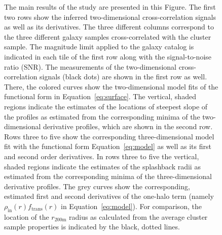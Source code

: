 \documentclass[iop, apjl, twocolappendix, numberedappendix]{emulateapj}
\begin{document}
\begin{figure}
\caption{The main results of the study are presented in this Figure.
The first two rows show the inferred two-dimensional cross-correlation
signals as well as its derivatives.
The three different columns correspond to the three different galaxy
samples cross-correlated with the cluster sample.
The magnitude limit applied to the galaxy catalog is indicated in 
each tile of the first row along with the signal-to-noise ratio (SNR).
The measurements of the two-dimensional cross-correlation
signals (black dots) are shown in the first row as well. There, the colored
curves show the two-dimensional model fits of the functional
form in Equation~\ref{eq:surface}. The vertical, shaded regions indicate 
the estimates of the locations of steepest slope of the profiles as estimated from the corresponding minima of the two-dimensional
derivative profiles, which are shown in the second row. 
Rows three to five show the corresponding three-dimensional model fit
with the functional form Equation~\ref{eq:model} as well as its first and
second order derivatives.
In rows three to five the vertical, shaded regions indicate the 
estimates of the splashback radii as estimated from the corresponding minima 
of the three-dimensional derivative profiles.
The grey curves show the corresponding, estimated first and second derivatives of the 
one-halo term (namely $\rho_{\mathrm{in}}(r)f_{\mathrm{trans}}(r)$ in Equation~\ref{eq:model}).
For comparison, the location of the $r_{\mathrm{200m}}$ radius as calculated 
from the average cluster sample properties is indicated by the black, dotted
lines.}
   \label{fig:all_graphs}
\end{figure}
\end{document}
